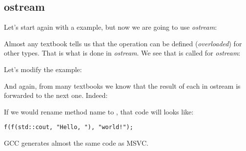 \subsection{ostream}

Let's start again with a  example, but now we are going to use \emph{ostream}:



Almost any \Cpp textbook tells us that the \TT{<<} operation can be defined (\emph{overloaded})
for other types.
That is what is done in \emph{ostream}.
We see that  is called for \emph{ostream}:



Let's modify the example:



And again, from many \Cpp textbooks we know that the result of each  in ostream is forwarded to the
next one.
Indeed:



If we would rename  method name to \ttf{}, that code will looks like:

\begin{lstlisting}[style=customc]
f(f(std::cout, "Hello, "), "world!");
\end{lstlisting}

GCC generates almost the same code as MSVC.

